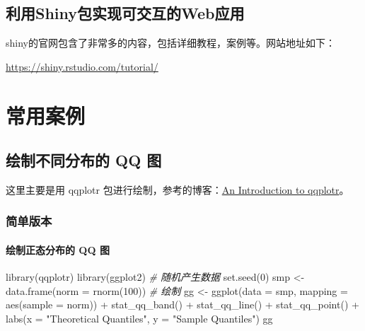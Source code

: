 \documentclass[
]{book}
\newenvironment{Shaded}{\begin{snugshade}}{\end{snugshade}}
\newcommand{\AttributeTok}[1]{\textcolor[rgb]{0.77,0.63,0.00}{#1}}
\newcommand{\CommentTok}[1]{\textcolor[rgb]{0.56,0.35,0.01}{\textit{#1}}}
\newcommand{\DecValTok}[1]{\textcolor[rgb]{0.00,0.00,0.81}{#1}}
\newcommand{\FunctionTok}[1]{\textcolor[rgb]{0.00,0.00,0.00}{#1}}
\newcommand{\NormalTok}[1]{#1}
\newcommand{\OtherTok}[1]{\textcolor[rgb]{0.56,0.35,0.01}{#1}}
\newcommand{\SpecialCharTok}[1]{\textcolor[rgb]{0.00,0.00,0.00}{#1}}
\newcommand{\StringTok}[1]{\textcolor[rgb]{0.31,0.60,0.02}{#1}}
\begin{document}
\hypertarget{ux5229ux7528shinyux5305ux5b9eux73b0ux53efux4ea4ux4e92ux7684webux5e94ux7528}{%
\section{利用Shiny包实现可交互的Web应用}\label{ux5229ux7528shinyux5305ux5b9eux73b0ux53efux4ea4ux4e92ux7684webux5e94ux7528}}

shiny的官网包含了非常多的内容，包括详细教程，案例等。网站地址如下：

\url{https://shiny.rstudio.com/tutorial/}

\hypertarget{some-tips-alls}{%
\chapter{常用案例}\label{some-tips-alls}}

\hypertarget{ux7ed8ux5236ux4e0dux540cux5206ux5e03ux7684-qq-ux56fe}{%
\section{绘制不同分布的 QQ 图}\label{ux7ed8ux5236ux4e0dux540cux5206ux5e03ux7684-qq-ux56fe}}

这里主要是用 qqplotr 包进行绘制，参考的博客：\href{https://cran.r-project.org/web/packages/qqplotr/vignettes/introduction.html}{An Introduction to qqplotr}。

\hypertarget{ux7b80ux5355ux7248ux672c}{%
\subsection{简单版本}\label{ux7b80ux5355ux7248ux672c}}

\hypertarget{ux7ed8ux5236ux6b63ux6001ux5206ux5e03ux7684-qq-ux56fe}{%
\subsubsection{绘制正态分布的 QQ 图}\label{ux7ed8ux5236ux6b63ux6001ux5206ux5e03ux7684-qq-ux56fe}}

\begin{Shaded}
\begin{Highlighting}[]
\FunctionTok{library}\NormalTok{(qqplotr)}
\FunctionTok{library}\NormalTok{(ggplot2)}
\CommentTok{\# 随机产生数据}
\FunctionTok{set.seed}\NormalTok{(}\DecValTok{0}\NormalTok{)}
\NormalTok{smp }\OtherTok{\textless{}{-}} \FunctionTok{data.frame}\NormalTok{(}\AttributeTok{norm =} \FunctionTok{rnorm}\NormalTok{(}\DecValTok{100}\NormalTok{))}
\CommentTok{\# 绘制}
\NormalTok{gg }\OtherTok{\textless{}{-}} \FunctionTok{ggplot}\NormalTok{(}\AttributeTok{data =}\NormalTok{ smp, }\AttributeTok{mapping =} \FunctionTok{aes}\NormalTok{(}\AttributeTok{sample =}\NormalTok{ norm)) }\SpecialCharTok{+}
    \FunctionTok{stat\_qq\_band}\NormalTok{() }\SpecialCharTok{+}
    \FunctionTok{stat\_qq\_line}\NormalTok{() }\SpecialCharTok{+}
    \FunctionTok{stat\_qq\_point}\NormalTok{() }\SpecialCharTok{+}
    \FunctionTok{labs}\NormalTok{(}\AttributeTok{x =} \StringTok{"Theoretical Quantiles"}\NormalTok{, }\AttributeTok{y =} \StringTok{"Sample Quantiles"}\NormalTok{)}
\NormalTok{gg}
\end{Highlighting}
\end{Shaded}
\end{document}

